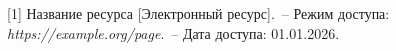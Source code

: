 \renewcommand{\bibsection}{\sectioncentered*{Список использованных источников}}
\pagebreak %


[1] Название ресурса [Электронный ресурс].~-- Режим доступа: \textit{https://example.\allowbreak org/\allowbreak page}.~-- Дата доступа: 01.01.2026.
